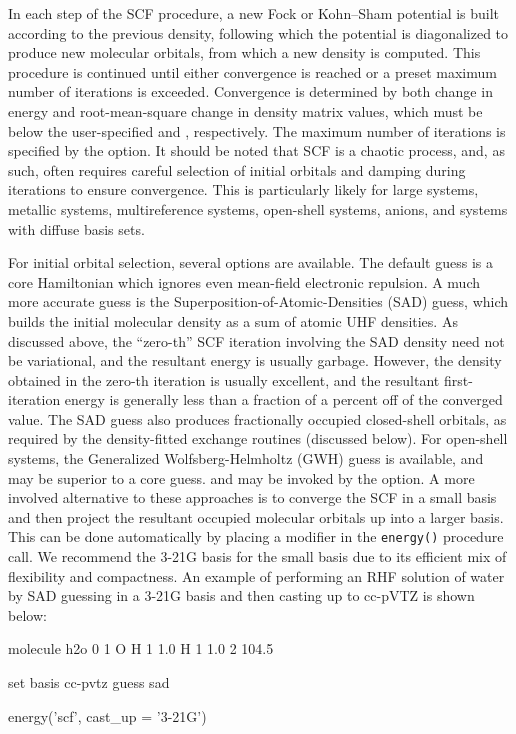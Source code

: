 In each step of the SCF procedure, a new Fock or Kohn--Sham potential is built
according to the previous density, following which the potential is diagonalized
to produce new molecular orbitals, from which a new density is computed. This
procedure is continued until either convergence is reached or a preset maximum
number of iterations is exceeded. Convergence is determined by both change in
energy and root-mean-square change in density matrix values, which must be below
the user-specified  and
, respectively. The maximum number of iterations is
specified by the  option. It should be noted that SCF is a
chaotic process, and, as such, often requires careful selection of initial
orbitals and damping during iterations to ensure convergence. This is
particularly likely for large systems, metallic systems, multireference systems,
open-shell systems, anions, and systems with diffuse basis sets. 

For initial orbital selection, several options are available. The default guess
is a core Hamiltonian which ignores even mean-field electronic repulsion. A much
more accurate guess is the Superposition-of-Atomic-Densities (SAD) guess, which
builds the initial molecular density as a sum of atomic UHF densities. As
discussed above, the ``zero-th'' SCF iteration involving the SAD density need
not be variational, and the resultant energy is usually garbage. However, the
density obtained in the zero-th iteration is usually excellent, and the
resultant first-iteration energy is generally less than a fraction of a percent
off of the converged value. The SAD guess also produces fractionally occupied
closed-shell orbitals, as required by the density-fitted exchange routines
(discussed below). For open-shell systems, the Generalized Wolfsberg-Helmholtz
(GWH) guess is available, and may be superior to a core guess.  and  may
be invoked by the  option. A more involved alternative to these
approaches is to converge the SCF in a small basis and then project the
resultant occupied molecular orbitals up into a larger basis. This can be done
automatically by placing a   modifier in
the \texttt{energy()} procedure call. We recommend the 3-21G basis for the small
basis due to its efficient mix of flexibility and compactness. An example of
performing an RHF solution of water by SAD guessing in a 3-21G basis and then
casting up to cc-pVTZ is shown below: 
\begin{Snippet}
molecule h2o {
0 1
O
H 1 1.0
H 1 1.0 2 104.5
}

set {
basis cc-pvtz 
guess sad
}

energy('scf', cast_up = '3-21G')
\end{Snippet}

